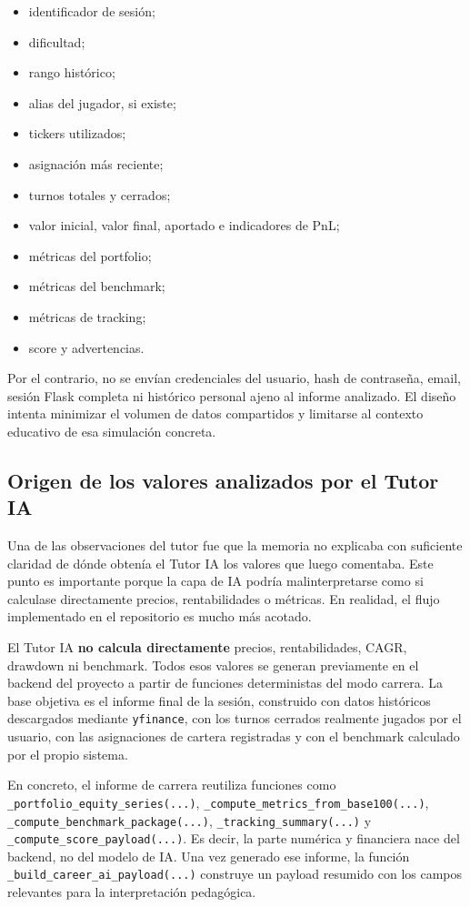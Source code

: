 \begin{itemize}
    \item identificador de sesión;
    \item dificultad;
    \item rango histórico;
    \item alias del jugador, si existe;
    \item tickers utilizados;
    \item asignación más reciente;
    \item turnos totales y cerrados;
    \item valor inicial, valor final, aportado e indicadores de PnL;
    \item métricas del portfolio;
    \item métricas del benchmark;
    \item métricas de tracking;
    \item score y advertencias.
\end{itemize}

Por el contrario, no se envían credenciales del usuario, hash de contraseña, email, sesión Flask completa ni histórico personal ajeno al informe analizado. El diseño intenta minimizar el volumen de datos compartidos y limitarse al contexto educativo de esa simulación concreta.

\subsection{Origen de los valores analizados por el Tutor IA}

Una de las observaciones del tutor fue que la memoria no explicaba con suficiente claridad de dónde obtenía el Tutor IA los valores que luego comentaba. Este punto es importante porque la capa de IA podría malinterpretarse como si calculase directamente precios, rentabilidades o métricas. En realidad, el flujo implementado en el repositorio es mucho más acotado.

El Tutor IA \textbf{no calcula directamente} precios, rentabilidades, CAGR, drawdown ni benchmark. Todos esos valores se generan previamente en el backend del proyecto a partir de funciones deterministas del modo carrera. La base objetiva es el informe final de la sesión, construido con datos históricos descargados mediante \texttt{yfinance}, con los turnos cerrados realmente jugados por el usuario, con las asignaciones de cartera registradas y con el benchmark calculado por el propio sistema.

En concreto, el informe de carrera reutiliza funciones como \texttt{\_portfolio\_equity\_series(...)}, \texttt{\_compute\_metrics\_from\_base100(...)}, \texttt{\_compute\_benchmark\_package(...)}, \texttt{\_tracking\_summary(...)} y \texttt{\_compute\_score\_payload(...)}. Es decir, la parte numérica y financiera nace del backend, no del modelo de IA. Una vez generado ese informe, la función \texttt{\_build\_career\_ai\_payload(...)} construye un payload resumido con los campos relevantes para la interpretación pedagógica.

